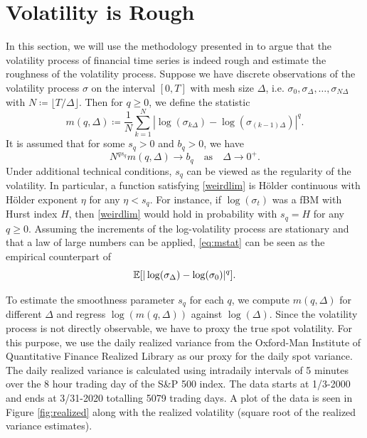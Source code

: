 \section{Volatility is Rough}\label{sec:volisrough}
In this section, we will use the methodology presented in \cite{volisrough} to argue that the volatility process of financial time series is indeed rough and estimate the roughness of the volatility process. Suppose we have discrete observations of the volatility process $\sigma$ on the interval $[0,T]$ with mesh size $\Delta$, i.e. $\sigma_{0},\sigma_{\Delta},\dots,\sigma_{N\Delta}$ with $N\coloneqq \lfloor T/\Delta\rfloor$. Then for $q\geq 0$, we define the statistic
\begin{equation}\label{eq:mstat}
    m(q,\Delta)\coloneqq \frac{1}{N}\sum_{k=1}^{N}|\log(\sigma_{k\Delta})-\log(\sigma_{(k-1)\Delta})|^{q}.
\end{equation}
It is assumed that for some $s_{q}>0$ and $b_{q}>0$, we have
\begin{equation}\label{weirdlim}
    N^{qs_{q}}m(q,\Delta)\to b_{q}\quad \textrm{as}\quad \Delta\to 0^{+}.
\end{equation}
Under additional technical conditions, $s_{q}$ can be viewed as the regularity of the volatility. In particular, a function satisfying \eqref{weirdlim} is Hölder continuous with Hölder exponent $\eta$ for any $\eta <s_{q}$. For instance, if $\log(\sigma_{t})$ was a fBM with Hurst index $H$, then \eqref{weirdlim} would hold in probability with $s_{q}=H$ for any $q\geq 0$. Assuming the increments of the log-volatility process are stationary and that a law of large numbers can be applied, \eqref{eq:mstat} can be seen as the empirical counterpart of 
\begin{equation}
    \E\left[|\log(\sigma_{\Delta})-\log(\sigma_{0})|^{q}\right].
\end{equation}

To estimate the smoothness parameter $s_{q}$ for each $q$, we compute $m(q,\Delta)$ for different $\Delta$ and regress $\log(m(q,\Delta))$ against $\log(\Delta)$. Since the volatility process is not directly observable, we have to proxy the true spot volatility. For this purpose, we use the daily realized variance from the Oxford-Man Institute of Quantitative Finance Realized Library as our proxy for the daily spot variance. The daily realized variance is calculated using intradaily intervals of 5 minutes over the 8 hour trading day of the S\&P 500 index. The data starts at 1/3-2000 and ends at 3/31-2020 totalling 5079 trading days. A plot of the data is seen in Figure \ref{fig:realized} along with the realized volatility (square root of the realized variance estimates).

